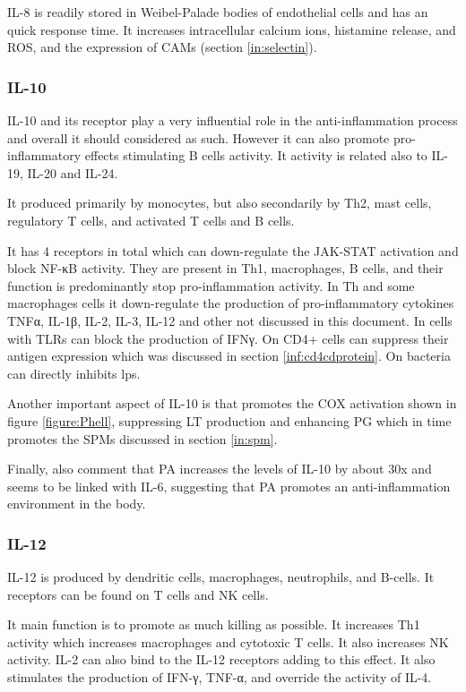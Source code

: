 IL-8 is readily stored in Weibel-Palade bodies of endothelial cells and has an quick response time. It increases intracellular calcium ions, histamine release, and ROS, and the expression of CAMs (section \ref{in:selectin}).


\subsubsection{IL-10}
\label{in:IL10}

IL-10 and its receptor play a very influential role in the anti-inflammation process and overall it should considered as such. However it can also promote pro-inflammatory effects stimulating B cells activity. It activity is related also to IL-19, IL-20 and IL-24.

It produced primarily by monocytes, but also secondarily by Th2, mast cells, regulatory T cells, and activated T cells and B cells.

It has 4 receptors in total which can down-regulate the JAK-STAT activation and block NF-κB activity. They are present in Th1, macrophages, B cells, and their function is predominantly stop pro-inflammation activity. In Th and some macrophages cells it down-regulate the production of pro-inflammatory cytokines TNFα, IL-1β, IL-2, IL-3, IL-12 and other not discussed in this document. In cells with TLRs can block the production of IFNγ. On CD4+ cells can suppress their antigen expression which was discussed in section \ref{inf:cd4cdprotein}. On bacteria can directly inhibits \gls{lps}.

Another important aspect of IL-10 is that promotes the COX activation shown in figure \ref{figure:Phell}, suppressing LT production and enhancing PG which in time promotes the SPMs discussed in section \ref{in:spm}.

Finally, also comment that PA increases the levels of IL-10 by about 30x \cite{Ostrowski1999} and seems to be linked with IL-6, suggesting that PA promotes an anti-inflammation environment in the body.

\subsubsection{IL-12}
\label{in:IL12}

IL-12 is produced by dendritic cells, macrophages, neutrophils, and B-cells. It receptors can be found on T cells and NK cells.

It main function is to promote as much killing as possible. It increases Th1 activity which increases macrophages and cytotoxic T cells. It also increases NK activity. IL-2 can also bind to the IL-12 receptors adding to this effect. It also stimulates the production of IFN-γ, TNF-α, and override the activity of IL-4.

